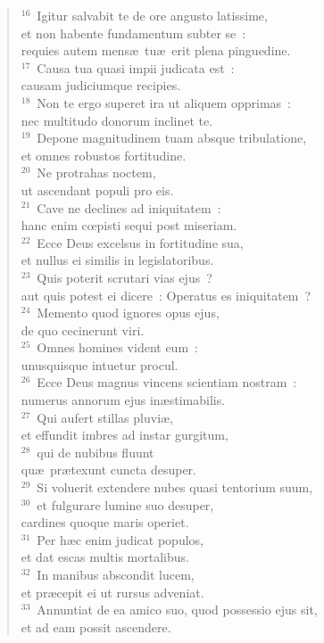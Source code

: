 \begin{flushleft}
\begin{verse}
${}^{16}$~Igitur salvabit te de ore angusto latissime,\\ et non habente fundamentum subter se~:\\ requies autem mens\ae\ tu\ae\ erit plena pinguedine.\\
${}^{17}$~Causa tua quasi impii judicata est~:\\ causam judiciumque recipies.\\
${}^{18}$~Non te ergo superet ira ut aliquem opprimas~:\\ nec multitudo donorum inclinet te.\\
${}^{19}$~Depone magnitudinem tuam absque tribulatione,\\ et omnes robustos fortitudine.\\
${}^{20}$~Ne protrahas noctem,\\ ut ascendant populi pro eis.\\
${}^{21}$~Cave ne declines ad iniquitatem~:\\ hanc enim cœpisti sequi post miseriam.\\
${}^{22}$~Ecce Deus excelsus in fortitudine sua,\\ et nullus ei similis in legislatoribus.\\
${}^{23}$~Quis poterit scrutari vias ejus~?\\ aut quis potest ei dicere~: Operatus es iniquitatem~?\\
${}^{24}$~Memento quod ignores opus ejus,\\ de quo cecinerunt viri.\\
${}^{25}$~Omnes homines vident eum~:\\ unusquisque intuetur procul.\\
${}^{26}$~Ecce Deus magnus vincens scientiam nostram~:\\ numerus annorum ejus in\ae stimabilis.\\
${}^{27}$~Qui aufert stillas pluvi\ae ,\\ et effundit imbres ad instar gurgitum,\\
${}^{28}$~qui de nubibus fluunt\\ qu\ae\ pr\ae texunt cuncta desuper.\\
${}^{29}$~Si voluerit extendere nubes quasi tentorium suum,\\
${}^{30}$~et fulgurare lumine suo desuper,\\ cardines quoque maris operiet.\\
${}^{31}$~Per h\ae c enim judicat populos,\\ et dat escas multis mortalibus.\\
${}^{32}$~In manibus abscondit lucem,\\ et pr\ae cepit ei ut rursus adveniat.\\
${}^{33}$~Annuntiat de ea amico suo, quod possessio ejus sit,\\ et ad eam possit ascendere.\end{verse}\end{flushleft}


